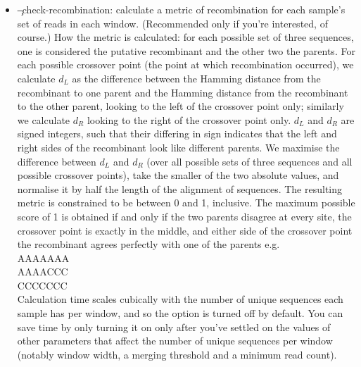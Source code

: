 \begin{itemize}
(sometimes) overlap with each other, but is very useful for such data.
With this option, overlapping mates in a pair are merged into a single (longer) read.
This allows wider windows to be used, enhancing the phylogenetic resolution in a single window.
Pairs will only be merged if they agree on the overlapping sequence; if they do not, that pair is discarded.
Discarded pairs can be inspected by using \c{--inspect-disagreeing-overlaps}.
\item \c{--check-recombination}: calculate a metric of recombination for each sample's set of reads in each window.
(Recommended only if you're interested, of course.)
How the metric is calculated: for each possible set of three sequences, one is considered the putative recombinant and the other two the parents.
For each possible crossover point (the point at which recombination occurred), we calculate $d_L$ as the difference between the Hamming distance from the recombinant to one parent and the Hamming distance from the recombinant to the other parent, looking to the left of the crossover point only; similarly we calculate $d_R$ looking to the right of the crossover point only.
$d_L$ and $d_R$ are signed integers, such that their differing in sign indicates that the left and right sides of the recombinant look like different parents.
We maximise the difference between $d_L$ and $d_R$ (over all possible sets of three sequences and all possible crossover points), take the smaller of the two absolute values, and normalise it by half the length of the alignment of sequences.
The resulting metric is constrained to be between 0 and 1, inclusive.
The maximum possible score of 1 is obtained if and only if the two parents disagree at every site, the crossover point is exactly in the middle, and either side of the crossover point the recombinant agrees perfectly with one of the parents e.g.\\
AAAAAAA\\
AAAACCC\\
CCCCCCC\\
Calculation time scales cubically with the number of unique sequences each sample has per window, and so the option is turned off by default.
You can save time by only turning it on only after you've settled on the values of other parameters that affect the number of unique sequences per window (notably window width, a merging threshold and a minimum
read count).
\end{itemize}

